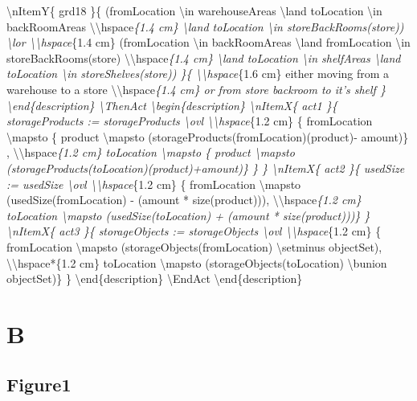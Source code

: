 \textbackslash{}nItemY\{ grd18 \}\{ (fromLocation \textbackslash{}in warehouseAreas \textbackslash{}land toLocation \textbackslash{}in backRoomAreas
\textbackslash{}\textbackslash{}hspace\emph{\{1.4 cm\} \textbackslash{}land toLocation \textbackslash{}in storeBackRooms(store)) \textbackslash{}lor
\textbackslash{}\textbackslash{}hspace}\{1.4 cm\} (fromLocation \textbackslash{}in backRoomAreas \textbackslash{}land fromLocation \textbackslash{}in storeBackRooms(store)
\textbackslash{}\textbackslash{}hspace\emph{\{1.4 cm\} \textbackslash{}land toLocation \textbackslash{}in shelfAreas \textbackslash{}land toLocation \textbackslash{}in storeShelves(store)) \}\{ \textbackslash{}\textbackslash{}hspace}\{1.6 cm\} either moving from a warehouse to a store
\textbackslash{}\textbackslash{}hspace\emph{\{1.4 cm\} or from store backroom to it's shelf \}
\textbackslash{}end\{description\}
\textbackslash{}ThenAct
\textbackslash{}begin\{description\}
\textbackslash{}nItemX\{ act1 \}\{ storageProducts := storageProducts \textbackslash{}ovl
\textbackslash{}\textbackslash{}hspace}\{1.2 cm\} \{ fromLocation \textbackslash{}mapsto \{ product \textbackslash{}mapsto (storageProducts(fromLocation)(product)- amount)\} ,
\textbackslash{}\textbackslash{}hspace\emph{\{1.2 cm\} toLocation \textbackslash{}mapsto \{ product \textbackslash{}mapsto (storageProducts(toLocation)(product)+amount)\} \} \}
\textbackslash{}nItemX\{ act2 \}\{ usedSize := usedSize \textbackslash{}ovl
\textbackslash{}\textbackslash{}hspace}\{1.2 cm\} \{ fromLocation \textbackslash{}mapsto (usedSize(fromLocation) - (amount * size(product))),
\textbackslash{}\textbackslash{}hspace\emph{\{1.2 cm\} toLocation \textbackslash{}mapsto (usedSize(toLocation) + (amount * size(product)))\} \}
\textbackslash{}nItemX\{ act3 \}\{ storageObjects := storageObjects \textbackslash{}ovl
\textbackslash{}\textbackslash{}hspace}\{1.2 cm\} \{ fromLocation \textbackslash{}mapsto (storageObjects(fromLocation) \textbackslash{}setminus objectSet),
\textbackslash{}\textbackslash{}hspace*\{1.2 cm\} toLocation \textbackslash{}mapsto (storageObjects(toLocation) \textbackslash{}bunion objectSet)\} \}
\textbackslash{}end\{description\}
\textbackslash{}EndAct
\textbackslash{}end\{description\}

\section{B}
\label{b}

\subsection{Figure1}
\label{figure1}

